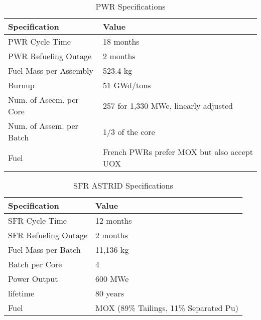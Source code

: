 \begin{table}[h]
	\centering
	\begin{tabularx}{\textwidth}{bb}
		\hline
		Specification & Value \\
		\hline
		PWR Cycle Time & 18 months \\ 
		PWR Refueling Outage & 2 months \\
		Fuel Mass per Assembly & 523.4 kg \\
		Burnup & 51 GWd/tons \\
		Num. of Aseem. per Core & 257 for 1,330 MWe, linearly adjusted\\
		Num. of Assem. per Batch & 1/3 of the core \\
		Fuel & \small{French \glspl{PWR} prefer \gls{MOX} but also accept \gls{UOX}}\\
		\hline
	\end{tabularx}
	\caption {\gls{PWR} Specifications}
	\label{tab:pwr}
	\end{table}
	
\begin{table}[h]
	\centering
	\begin{tabularx}{\textwidth}{bb}
		\hline
		Specification & Value \\
		\hline
		SFR Cycle Time & 12 months \\ 
		SFR Refueling Outage & 2 months \\
		Fuel Mass per Batch & 11,136 kg \\
		Batch per Core & 4 \\
		Power Output & 600 MWe \\
		lifetime & 80 years \\
		Fuel & {\small \gls{MOX} (89\% Tailings, 11\% Separated Pu)}\\
		\hline
	\end{tabularx}
	\caption {\gls{SFR} ASTRID Specifications \cite{marsaultmarie-sophie_pre-conceptual_2012}}
	\label{tab:sfr}
\end{table}
\FloatBarrier

